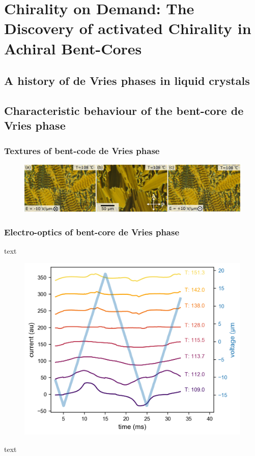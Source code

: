 \documentclass[aagreenthesis]{subfiles}
\begin{document}
\chapter{Chirality on Demand: The Discovery of activated Chirality in Achiral
Bent-Cores}
\section{A history of de Vries phases in liquid crystals}
\section{Characteristic behaviour of the bent-core de Vries phase}
\subsection{Textures of bent-code de Vries phase}

\begin{figure}[h!]
    \centering
    \includegraphics[width=.8\textwidth]{figs/pal30/textureSM2/sm1Textures100.png}
    \caption{\label{}}
\end{figure}


\subsection{Electro-optics of bent-core de Vries phase}
text
\begin{figure}[h!]
    \centering
    \includegraphics[width=.8\textwidth]{figs/pal30/prc/spacedSm1PRC.png}
    \caption{\label{}}
\end{figure}
text
\end{document}
